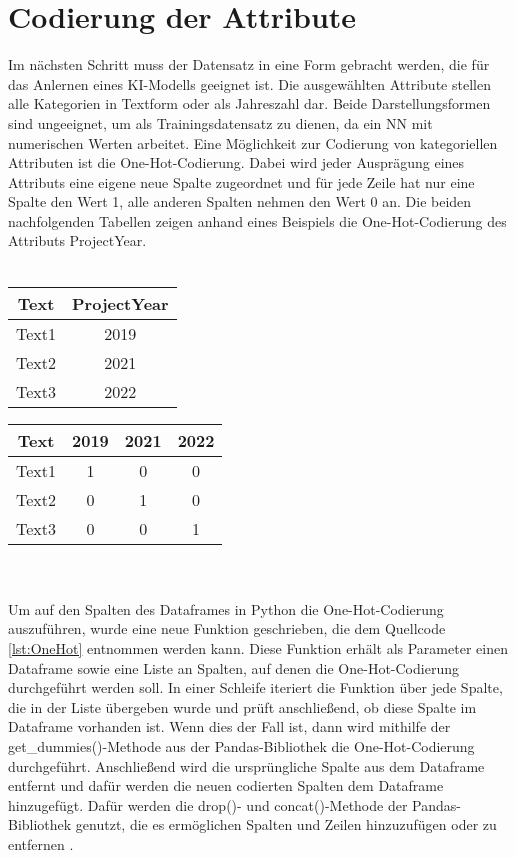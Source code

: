 \section{Codierung der Attribute}
Im nächsten Schritt muss der Datensatz in eine Form gebracht werden, die für das Anlernen eines \ac{KI}-Modells geeignet ist. Die ausgewählten Attribute stellen alle Kategorien in 
Textform oder als Jahreszahl dar. Beide Darstellungsformen sind ungeeignet, um als Trainingsdatensatz zu dienen, da ein \ac{NN} mit numerischen Werten arbeitet. 
Eine Möglichkeit zur Codierung von kategoriellen Attributen ist die One-Hot-Codierung. Dabei wird jeder Ausprägung eines Attributs eine eigene neue Spalte zugeordnet 
und für jede Zeile hat nur eine Spalte den Wert 1, alle anderen Spalten nehmen den Wert 0 an. Die beiden nachfolgenden Tabellen zeigen anhand eines Beispiels die 
One-Hot-Codierung des Attributs \glqq ProjectYear\grqq{}.
\\  
\\
\begin{minipage}[c]{0.5\textwidth}
    \centering
    \begin{tabular}{|c|c|}
        \hline
        \textbf{Text} & \textbf{ProjectYear}\\ \hline
        Text1&2019\\
        Text2&2021\\
        Text3&2022\\
        \hline
    \end{tabular}
\end{minipage}
\begin{minipage}[c]{0.5\textwidth}
    \centering
    \begin{tabular}{|c|c|c|c|}
        \hline
        \textbf{Text} & \textbf{2019} & \textbf{2021} & \textbf{2022}\\ \hline
        Text1 & 1 & 0 & 0\\
        Text2 & 0 & 1 & 0\\
        Text3 & 0 & 0 & 1\\
        \hline
    \end{tabular}
\end{minipage}
\\
\\
Um auf den Spalten des Dataframes in Python die One-Hot-Codierung auszuführen, wurde eine neue Funktion geschrieben, die dem Quellcode \ref{lst:OneHot} entnommen werden kann.
Diese Funktion erhält als Parameter einen Dataframe sowie eine Liste an Spalten, auf denen die One-Hot-Codierung durchgeführt werden soll. In einer Schleife iteriert die Funktion 
über jede Spalte, die in der Liste übergeben wurde und prüft anschließend, ob diese Spalte im Dataframe vorhanden ist. Wenn dies der Fall ist, dann wird mithilfe der 
get\_dummies()-Methode aus der Pandas-Bibliothek die One-Hot-Codierung durchgeführt. Anschließend wird die ursprüngliche Spalte aus dem Dataframe entfernt und dafür werden
die neuen codierten Spalten dem Dataframe hinzugefügt. Dafür werden die drop()- und concat()-Methode der Pandas-Bibliothek genutzt, die es ermöglichen Spalten und Zeilen
hinzuzufügen oder zu entfernen \cite{PandasDoc}.

